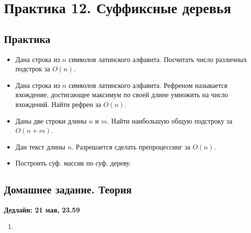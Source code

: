 \section{Практика 12. Суффиксные деревья}

\subsection{Практика}

\begin{itemize}

  \item Дана строка из $n$ символов латинского алфавита. Посчитать число различных 
  подстрок за $O(n)$.

  \item Дана строка из $n$ символов латинского алфавита. Рефреном называется
  вхождение, достигающее максимум по своей длине умножить на число вхождений.
  Найти рефрен за $O(n)$.

  \item Даны две строки длины $n$ и $m$. Найти наибольшую общую подстроку
  за $O(n + m)$.

  \item Дан текст длины $n$. Разрешается сделать препроцессинг за $O(n)$.

  \item Построить суф. массив по суф. дереву.

\end{itemize}

\subsection{Домашнее задание. Теория}
\textbf{Дедлайн: 21 мая, 23.59}

\begin{enumerate}

  \item 

\end{enumerate}



\clearpage
